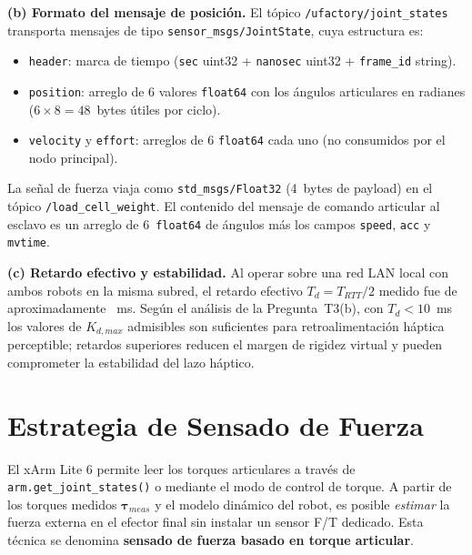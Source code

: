 \documentclass[journal,10pt,twoside]{IEEEtran}
\newcommand{\answerline}[1][3cm]{\underline{\hspace{#1}}}
\begin{document}
\textbf{(b) Formato del mensaje de posición.}
El tópico \texttt{/ufactory/joint\_states} transporta mensajes
de tipo \texttt{sensor\_msgs/JointState}, cuya estructura es:
\begin{itemize}
  \item \texttt{header}: marca de tiempo
        (\texttt{sec} uint32 + \texttt{nanosec} uint32 +
        \texttt{frame\_id} string).
  \item \texttt{position}: arreglo de 6 valores \texttt{float64}
        con los ángulos articulares en radianes
        ($6 \times 8 = 48$~bytes útiles por ciclo).
  \item \texttt{velocity} y \texttt{effort}: arreglos de 6
        \texttt{float64} cada uno (no consumidos por el nodo principal).
\end{itemize}
La señal de fuerza viaja como \texttt{std\_msgs/Float32}
(4~bytes de payload) en el tópico \texttt{/load\_cell\_weight}.
El contenido del mensaje de comando articular al esclavo es un
arreglo de 6~\texttt{float64} de ángulos más los campos
\texttt{speed}, \texttt{acc} y \texttt{mvtime}.

\textbf{(c) Retardo efectivo y estabilidad.}
Al operar sobre una red LAN local con ambos robots en la misma
subred, el retardo efectivo $T_d = T_{RTT}/2$ medido fue de
aproximadamente \answerline[1.5cm]~ms. Según el análisis
de la Pregunta~T3(b), con $T_d < 10$~ms los valores de
$K_{d,max}$ admisibles son suficientes para retroalimentación
háptica perceptible; retardos superiores reducen el margen de
rigidez virtual y pueden comprometer la estabilidad del lazo
háptico.


\section{Estrategia de Sensado de Fuerza}
\label{sec:force}

\begin{theorybox}
  El xArm Lite 6 permite leer los torques articulares a través de
  \texttt{arm.get\_joint\_states()} o mediante el modo de control de
  torque. A partir de los torques medidos $\bm{\tau}_{meas}$ y el
  modelo dinámico del robot, es posible \emph{estimar} la fuerza
  externa en el efector final sin instalar un sensor F/T dedicado.
  Esta técnica se denomina \textbf{sensado de fuerza basado en torque articular}.
\end{theorybox}
\end{document}
